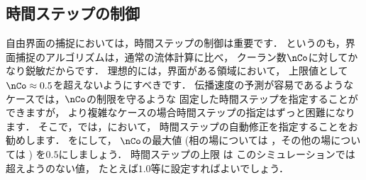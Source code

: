 \subsection{時間ステップの制御}
\label{ssec:2.3.5}
自由界面の捕捉においては，時間ステップの制御は重要です．
というのも，界面捕捉のアルゴリズムは，通常の流体計算に比べ，
クーラン数$\nCo$に対してかなり鋭敏だからです．
理想的には，界面がある領域において，
上限値として$\nCo \approx 0.5$を超えないようにすべきです．
伝播速度の予測が容易であるようなケースでは，$\nCo$の制限を守るような
固定した時間ステップを指定することができますが，
より複雑なケースの場合時間ステップの指定はずっと困難になります．
そこで，では，において，
時間ステップの自動修正を指定することをお勧めします．
%
%
をにして，
$\nCo$の最大値 (相の場については
%
%
，その他の場については
%
%
) を$0.5$にしましょう．
時間ステップの上限
%
%
は
このシミュレーションでは超えようのない値，
たとえば$1.0$等に設定すればよいでしょう．

